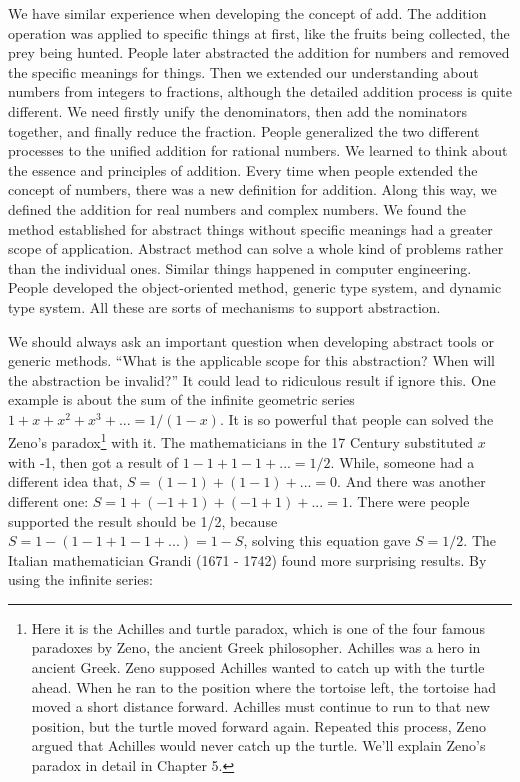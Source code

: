 \documentclass{article}
\begin{document}
We have similar experience when developing the concept of add. The addition operation was applied to specific things at first, like the fruits being collected, the prey being hunted. People later abstracted the addition for numbers and removed the specific meanings for things. Then we extended our understanding about numbers from integers to fractions, although the detailed addition process is quite different. We need firstly unify the denominators, then add the nominators together, and finally reduce the fraction. People generalized the two different processes to the unified addition for rational numbers. We learned to think about the essence and principles of addition. Every time when people extended the concept of numbers, there was a new definition for addition. Along this way, we defined the addition for real numbers and complex numbers. We found the method established for abstract things without specific meanings had a greater scope of application. Abstract method can solve a whole kind of problems rather than the individual ones. Similar things happened in computer engineering. People developed the object-oriented method, generic type system, and dynamic type system. All these are sorts of mechanisms to support abstraction.

We should always ask an important question when developing abstract tools or generic methods. ``What is the applicable scope for this abstraction? When will the abstraction be invalid?'' It could lead to ridiculous result if ignore this. One example is about the sum of the infinite geometric series $1 + x + x^2 + x^3 + ... = 1/(1-x)$. It is so powerful that people can solved the Zeno's paradox\footnote{Here it is the Achilles and turtle paradox, which is one of the four famous paradoxes by Zeno, the ancient Greek philosopher. Achilles was a hero in ancient Greek. Zeno supposed Achilles wanted to catch up with the turtle ahead. When he ran to the position where the tortoise left, the tortoise had moved a short distance forward. Achilles must continue to run to that new position, but the turtle moved forward again. Repeated this process, Zeno argued that Achilles would never catch up the turtle. We'll explain Zeno's paradox in detail in Chapter 5.} with it. The mathematicians in the 17 Century substituted $x$ with -1, then got a result of $1 - 1 + 1 - 1 + ... = 1/2$. While, someone had a different idea that, $S = (1 - 1) + (1 - 1)+ ... = 0$. And there was another different one: $S = 1 + (-1 + 1) + (-1 + 1) + ... = 1$. There were people supported the result should be 1/2, because $S = 1 - (1 - 1 + 1 - 1 + ...) = 1 -S$, solving this equation gave $S = 1/2$. The Italian mathematician Grandi (1671 - 1742) found more surprising results. By using the infinite series:
\end{document}

